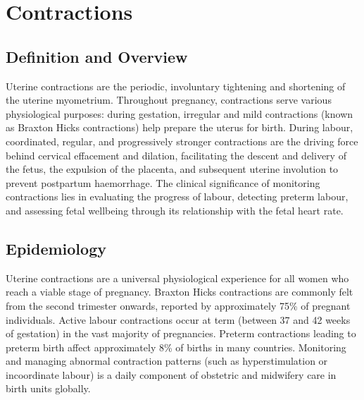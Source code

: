 \chapter{Contractions}

\section*{Definition and Overview}
Uterine contractions are the periodic, involuntary tightening and shortening of the uterine myometrium. Throughout pregnancy, contractions serve various physiological purposes: during gestation, irregular and mild contractions (known as Braxton Hicks contractions) help prepare the uterus for birth. During labour, coordinated, regular, and progressively stronger contractions are the driving force behind cervical effacement and dilation, facilitating the descent and delivery of the fetus, the expulsion of the placenta, and subsequent uterine involution to prevent postpartum haemorrhage. The clinical significance of monitoring contractions lies in evaluating the progress of labour, detecting preterm labour, and assessing fetal wellbeing through its relationship with the fetal heart rate.

\section*{Epidemiology}
Uterine contractions are a universal physiological experience for all women who reach a viable stage of pregnancy. Braxton Hicks contractions are commonly felt from the second trimester onwards, reported by approximately 75\% of pregnant individuals. Active labour contractions occur at term (between 37 and 42 weeks of gestation) in the vast majority of pregnancies. Preterm contractions leading to preterm birth affect approximately 8\% of births in many countries. Monitoring and managing abnormal contraction patterns (such as hyperstimulation or incoordinate labour) is a daily component of obstetric and midwifery care in birth units globally.

